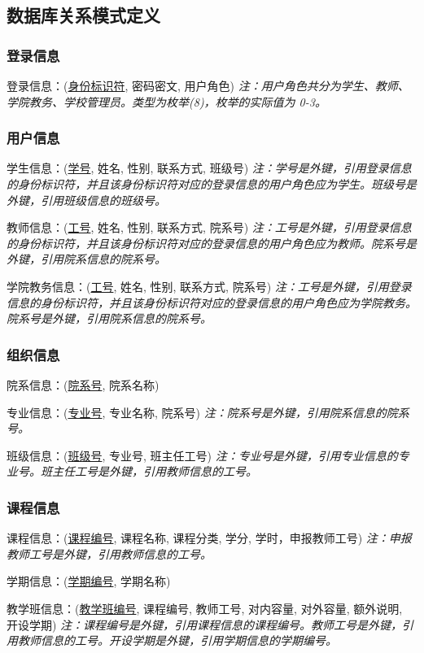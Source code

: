 \subsection{数据库关系模式定义}
\subsubsection{登录信息}
\textsf{登录信息：}(\uline{身份标识符}, 密码密文, 用户角色)
\textsl{注：用户角色共分为学生、教师、学院教务、学校管理员。类型为枚举(8)，枚举的实际值为 0-3。}

\subsubsection{用户信息}
\textsf{学生信息：}(\uline{学号}, 姓名, 性别, 联系方式, 班级号) 
\textsl{注：学号是外键，引用登录信息的身份标识符，并且该身份标识符对应的登录信息的用户角色应为学生。班级号是外键，引用班级信息的班级号。}

\textsf{教师信息：}(\uline{工号}, 姓名, 性别, 联系方式, 院系号)
\textsl{注：工号是外键，引用登录信息的身份标识符，并且该身份标识符对应的登录信息的用户角色应为教师。院系号是外键，引用院系信息的院系号。}

\textsf{学院教务信息：}(\uline{工号}, 姓名, 性别, 联系方式, 院系号)
\textsl{注：工号是外键，引用登录信息的身份标识符，并且该身份标识符对应的登录信息的用户角色应为学院教务。院系号是外键，引用院系信息的院系号。}

\subsubsection{组织信息}
\textsf{院系信息：}(\uline{院系号}, 院系名称)

\textsf{专业信息：}(\uline{专业号}, 专业名称, 院系号)
\textsl{注：院系号是外键，引用院系信息的院系号。}

\textsf{班级信息：}(\uline{班级号}, 专业号, 班主任工号)
\textsl{注：专业号是外键，引用专业信息的专业号。班主任工号是外键，引用教师信息的工号。}

\subsubsection{课程信息}
\textsf{课程信息：}(\uline{课程编号}, 课程名称, 课程分类, 学分, 学时，申报教师工号)
\textsl{注：申报教师工号是外键，引用教师信息的工号。}

\textsf{学期信息：}(\uline{学期编号}, 学期名称)

\textsf{教学班信息：}(\uline{教学班编号}, 课程编号, 教师工号, 对内容量, 对外容量, 额外说明, 开设学期)
\textsl{注：课程编号是外键，引用课程信息的课程编号。教师工号是外键，引用教师信息的工号。开设学期是外键，引用学期信息的学期编号。}

